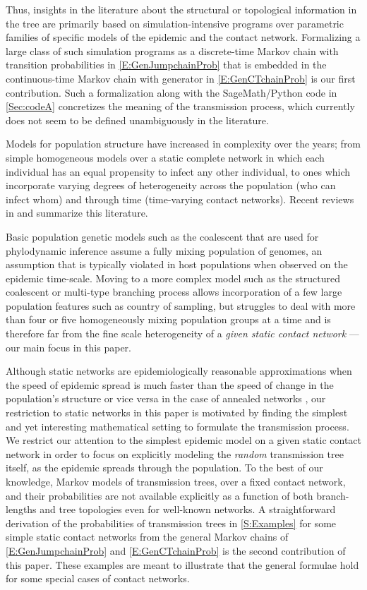 \documentclass[review]{elsarticle}
\numberwithin{equation}{section}
\let\orgautoref\autoref
\renewcommand{\autoref}
        {\def\equationautorefname{Eq.}%
         \def\figureautorefname{Fig.}%
         \def\subfigureautorefname{Fig.}%
         \def\sectionautorefname{Sect.}%
         \def\subsectionautorefname{Sect.}%
         \def\subsubsectionautorefname{Sect.}%
         \def\Itemautorefname{item}%
         \def\tableautorefname{Table}%
         \def\propositionautorefname{Prop.}%
         \def\corollaryautorefname{Corollary}%
         \def\theoremautorefname{Theorem}%
         \def\remarkautorefname{Remark}%
         \def\lemmaautorefname{Lemma}%
         \def\proofofautorefname{Proof}%
         \def\exampleautorefname{Example}%
         \orgautoref}
\providecommand{\autorefs}
        {\def\equationautorefname{Eqs.}%
         \def\figureautorefname{Figs.}%
         \def\subfigureautorefname{Figs.}%
         \def\sectionautorefname{Sects.}%
         \def\subsectionautorefname{Sects.}%
         \def\subsubsectionautorefname{Sects.}%
         \def\Itemautorefname{items}%
         \def\tableautorefname{Tables}%
         \def\propositionautorefname{Props.}%
         \def\theoremautorefname{Theorems}%
         \def\theoremautorefname{Remarks}%
         \def\lemmaautorefname{Lemmas}%
         \def\proofofautorefname{Proofs}%
         \def\exampleautorefname{Examples}%
         \orgautoref}
\begin{document}
Thus, insights in the literature about the structural or topological information in the tree are primarily based on simulation-intensive programs over parametric families of specific models of the epidemic and the contact network. 
Formalizing a large class of such simulation programs as a discrete-time Markov chain with transition probabilities in \autoref{E:GenJumpchainProb} that is embedded in the continuous-time Markov chain with generator in \autoref{E:GenCTchainProb} is our first contribution.  
Such a formalization along with the SageMath/Python code in \autoref{Sec:codeA} concretizes the meaning of the transmission process, which currently does not seem to be defined unambiguously in the literature.

Models for population structure have increased in complexity over the years; from simple homogeneous models over a static complete network in which each individual has an equal propensity to infect any other individual, to ones which incorporate varying degrees of heterogeneity across the population (who can infect whom) and through time (time-varying contact networks).  
Recent reviews in \cite{pastor2015} and \cite{holme2015} summarize this literature.  

Basic population genetic models such as the coalescent \citep{kingman1982} that are used for phylodynamic inference assume a fully mixing population of genomes, an assumption that is typically violated in host populations when observed on the epidemic time-scale.  
Moving to a more complex model such as the structured coalescent \citep{hudson1990, notohara1990} or multi-type branching process \citep{stadler2012} allows incorporation of a few large population features such as country of sampling, but struggles to deal with more than four or five homogeneously mixing population groups at a time \citep{Vaughan2014, stadler2012, rasmussen2014} and is therefore far from the fine scale heterogeneity of a {\em given static contact network} --- our main focus in this paper.


Although static networks are epidemiologically reasonable approximations when the speed of epidemic spread is much faster than the speed of change in the population's structure or vice versa in the case of annealed networks \citep[III.E]{pastor2015}, our restriction to static networks in this paper is motivated by finding the simplest and yet interesting mathematical setting to formulate the transmission process.
We restrict our attention to the simplest epidemic model on a given static contact network in order to focus on explicitly modeling the {\em random} transmission tree itself, as the epidemic spreads through the population.  
To the best of our knowledge, Markov models of transmission trees, over a fixed contact network, and their probabilities are not available explicitly as a function of both branch-lengths and tree topologies even for well-known networks.  
A straightforward derivation of the probabilities of transmission trees in \autoref{S:Examples} for some simple static contact networks from the general Markov chains of \autorefs{E:GenJumpchainProb} and \ref{E:GenCTchainProb} is the second contribution of this paper.
These examples are meant to illustrate that the general formulae hold for some special cases of contact networks.
\end{document}
